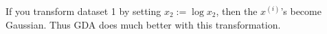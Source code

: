 \begin{answer}
	If you transform dataset 1 by setting $x_2 := \log x_2$, then the $x^{(i)}$'s
	become Gaussian. Thus GDA does much better with this transformation.
\end{answer}
